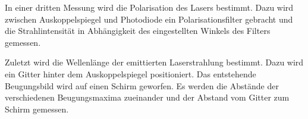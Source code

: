 In einer dritten Messung wird die Polarisation des Lasers bestimmt. Dazu wird
zwischen Auskoppelspiegel und Photodiode ein Polarisationsfilter gebracht und
die Strahlintensität in Abhängigkeit des eingestellten Winkels des Filters
gemessen.

Zuletzt wird die Wellenlänge der emittierten Laserstrahlung bestimmt. Dazu wird
ein Gitter hinter dem Auskoppelspiegel positioniert. Das entstehende
Beugungsbild wird auf einen Schirm geworfen. Es werden die Abstände der
verschiedenen Beugungsmaxima zueinander und der Abstand vom Gitter zum Schirm
gemessen.
